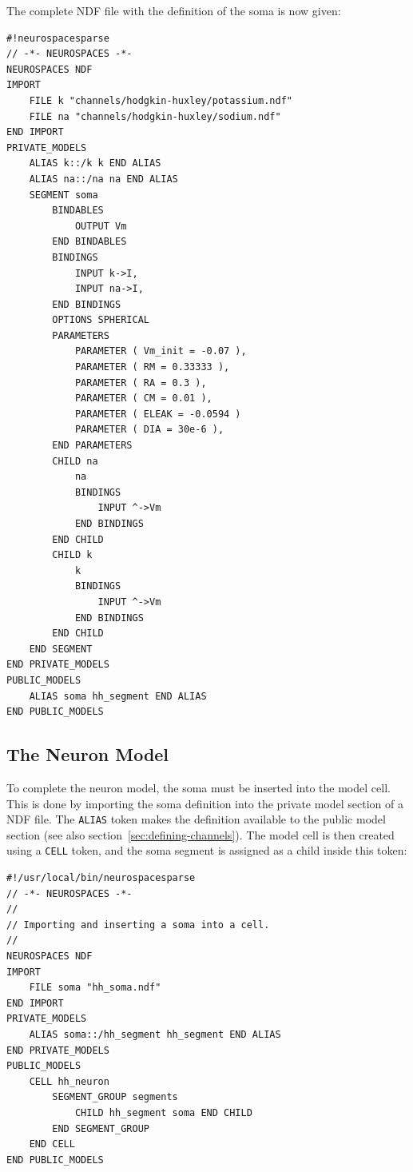 \documentclass[12pt]{article}
\begin{document}
The complete NDF file with the definition of the soma is now given:

\begin{verbatim}
#!neurospacesparse
// -*- NEUROSPACES -*-
NEUROSPACES NDF
IMPORT
    FILE k "channels/hodgkin-huxley/potassium.ndf"
    FILE na "channels/hodgkin-huxley/sodium.ndf"
END IMPORT
PRIVATE_MODELS
    ALIAS k::/k k END ALIAS
    ALIAS na::/na na END ALIAS
    SEGMENT soma
        BINDABLES
            OUTPUT Vm
        END BINDABLES
        BINDINGS
            INPUT k->I,
            INPUT na->I,
        END BINDINGS
        OPTIONS SPHERICAL
        PARAMETERS
            PARAMETER ( Vm_init = -0.07 ),
            PARAMETER ( RM = 0.33333 ),
            PARAMETER ( RA = 0.3 ),
            PARAMETER ( CM = 0.01 ),
            PARAMETER ( ELEAK = -0.0594 )
            PARAMETER ( DIA = 30e-6 ),
        END PARAMETERS
        CHILD na
            na
            BINDINGS
                INPUT ^->Vm
            END BINDINGS
        END CHILD
        CHILD k
            k
            BINDINGS
                INPUT ^->Vm
            END BINDINGS
        END CHILD
    END SEGMENT
END PRIVATE_MODELS
PUBLIC_MODELS
    ALIAS soma hh_segment END ALIAS
END PUBLIC_MODELS
\end{verbatim}

\subsection{The Neuron Model}
\label{sec:neuron-model}

To complete the neuron model, the soma must be inserted into the model
cell.  This is done by importing the soma definition into the private
model section of a NDF file.  The {\tt ALIAS} token makes the
definition available to the public model section (see also
section~\ref{sec:defining-channels}).  The model cell is then created
using a {\tt CELL} token, and the soma segment is assigned as a child
inside this token:

\begin{verbatim}
#!/usr/local/bin/neurospacesparse
// -*- NEUROSPACES -*-
//
// Importing and inserting a soma into a cell.
//
NEUROSPACES NDF
IMPORT
    FILE soma "hh_soma.ndf"
END IMPORT
PRIVATE_MODELS
    ALIAS soma::/hh_segment hh_segment END ALIAS
END PRIVATE_MODELS
PUBLIC_MODELS
    CELL hh_neuron
        SEGMENT_GROUP segments
            CHILD hh_segment soma END CHILD
        END SEGMENT_GROUP
    END CELL
END PUBLIC_MODELS
\end{verbatim}
\end{document}
